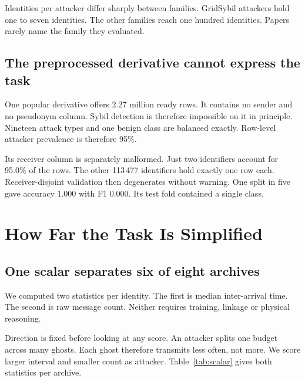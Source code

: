 \documentclass[conference]{IEEEtran}
\begin{document}
Identities per attacker differ sharply between families.
GridSybil attackers hold one to seven identities.
The other families reach one hundred identities.
Papers rarely name the family they evaluated.

\subsection{The preprocessed derivative cannot express the task}

One popular derivative offers 2.27 million ready rows.
It contains no sender and no pseudonym column.
Sybil detection is therefore impossible on it in principle.
Nineteen attack types and one benign class are balanced exactly.
Row-level attacker prevalence is therefore 95\%.

Its receiver column is separately malformed.
Just two identifiers account for 95.0\% of the rows.
The other 113\,477 identifiers hold exactly one row each.
Receiver-disjoint validation then degenerates without warning.
One split in five gave accuracy 1.000 with F1 0.000.
Its test fold contained a single class.

\section{How Far the Task Is Simplified}

\subsection{One scalar separates six of eight archives}

We computed two statistics per identity.
The first is median inter-arrival time.
The second is raw message count.
Neither requires training, linkage or physical reasoning.

Direction is fixed before looking at any score.
An attacker splits one budget across many ghosts.
Each ghost therefore transmits less often, not more.
We score larger interval and smaller count as attacker.
Table~\ref{tab:scalar} gives both statistics per archive.
\end{document}
